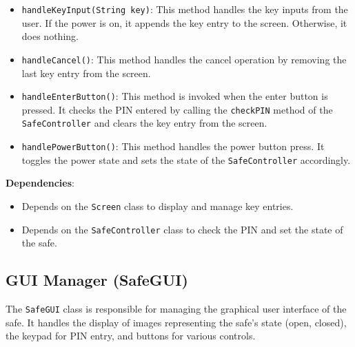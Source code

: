 \documentclass{article}
\begin{document}
\begin{itemize}
    \item \texttt{handleKeyInput(String key)}: This method handles the key inputs from the user. If the power is on, it appends the key entry to the screen. Otherwise, it does nothing.
    \item \texttt{handleCancel()}: This method handles the cancel operation by removing the last key entry from the screen.
    \item \texttt{handleEnterButton()}: This method is invoked when the enter button is pressed. It checks the PIN entered by calling the \texttt{checkPIN} method of the \texttt{SafeController} and clears the key entry from the screen.
    \item \texttt{handlePowerButton()}: This method handles the power button press. It toggles the power state and sets the state of the \texttt{SafeController} accordingly.
\end{itemize}
\textbf{Dependencies}:
\begin{itemize}
    \item Depends on the \texttt{Screen} class to display and manage key entries.
    \item Depends on the \texttt{SafeController} class to check the PIN and set the state of the safe.
\end{itemize}

\subsection{GUI Manager (SafeGUI)}
The \texttt{SafeGUI} class is responsible for managing the graphical user interface of the safe. It handles the display of images representing the safe's state (open, closed), the keypad for PIN entry, and buttons for various controls.
\end{document}
